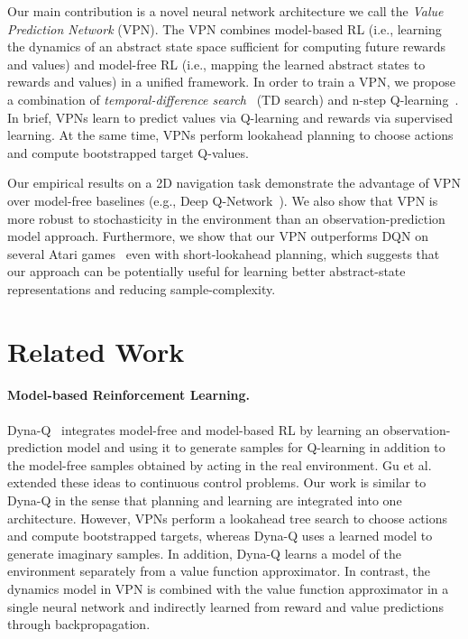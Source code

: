 \documentclass{article}
\newcommand{\obsmodel}{{observation-prediction model}}
\newcommand{\cutsectionup}{\vspace*{-0.05in}}
\newcommand{\cutsectiondown}{\vspace*{-0.03in}}
\begin{document}
Our main contribution is a novel neural network architecture we call the \textit{Value Prediction Network} (VPN). 
The VPN combines model-based RL (i.e., learning the dynamics of an abstract state space sufficient for computing future rewards and values) and model-free RL (i.e., mapping the learned abstract states to rewards and values) in a unified framework. In order to train a VPN, we propose a combination of \textit{temporal-difference search}~\citep{Silver2012TemporaldifferenceSI} (TD search) and n-step Q-learning~\citep{mnih2016asynchronous}. In brief, VPNs learn to predict values via Q-learning and rewards via supervised learning. At the same time, VPNs perform lookahead planning to choose actions and compute bootstrapped target Q-values.

Our empirical results on a 2D navigation task demonstrate the advantage of VPN over model-free baselines (e.g., Deep Q-Network~\citep{mnih2015human}). We also show that VPN is more robust to stochasticity in the environment than an \obsmodel{} approach. Furthermore, we show that our VPN outperforms DQN on several Atari games~\citep{bellemare2012arcade} even with short-lookahead planning, which suggests that our approach can be potentially useful for learning better abstract-state representations and reducing sample-complexity.

\cutsectionup
\section{Related Work}
\cutsectiondown

\paragraph{Model-based Reinforcement Learning.}
Dyna-Q~\citep{Sutton1990IntegratedAF,Sutton2008DynaStylePW,yao2009multi} integrates model-free and model-based RL by learning an \obsmodel{} and using it to generate samples for Q-learning in addition to the model-free samples obtained by acting in the real environment. Gu et al.~\citep{Gu2016ContinuousDQ} extended these ideas to continuous control problems. Our work is similar to Dyna-Q in the sense that planning and learning are integrated into one architecture. However, VPNs perform a lookahead tree search to choose actions and compute bootstrapped targets, whereas Dyna-Q uses a learned model to generate imaginary samples. In addition, Dyna-Q learns a model of the environment separately from a value function approximator. In contrast, the dynamics model in VPN is combined with the value function approximator in a single neural network and indirectly learned from reward and value predictions through backpropagation.
\end{document}
